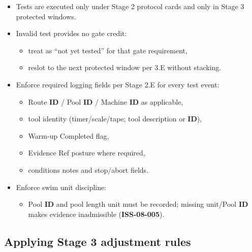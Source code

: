 \documentclass[10pt]{article}
\begin{document}
\begin{itemize}
\item Tests are executed only under Stage 2 protocol cards and only in Stage 3 protected windows.
\item Invalid test provides no gate credit:
  \begin{itemize}
  \item treat as “not yet tested” for that gate requirement,
  \item reslot to the next protected window per 3.E without stacking.
  \end{itemize}
\item Enforce required logging fields per Stage 2.E for every test event:
  \begin{itemize}
  \item Route \textbf{ID} / Pool \textbf{ID} / Machine \textbf{ID} as applicable,
  \item tool identity (timer/scale/tape; tool description or \textbf{ID}),
  \item Warm-up Completed flag,
  \item Evidence Ref posture where required,
  \item conditions notes and stop/abort fields.
  \end{itemize}
\item Enforce swim unit discipline:
  \begin{itemize}
  \item Pool \textbf{ID} and pool length unit must be recorded; missing unit/Pool \textbf{ID} makes evidence inadmissible (\textbf{ISS-08-005}).
  \end{itemize}
\end{itemize}

\subsection*{Applying Stage 3 adjustment rules}
{}
\end{document}
